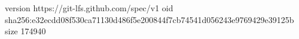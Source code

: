 version https://git-lfs.github.com/spec/v1
oid sha256:e32ecdd08f530ca71130d486f5e200844f7cb74541d056243e9769429e39125b
size 174940
